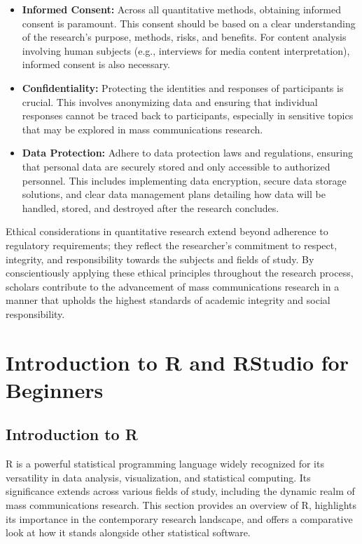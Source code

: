 \documentclass[
]{book}
\begin{document}
\begin{itemize}
\item
  \textbf{Informed Consent:} Across all quantitative methods, obtaining informed consent is paramount. This consent should be based on a clear understanding of the research's purpose, methods, risks, and benefits. For content analysis involving human subjects (e.g., interviews for media content interpretation), informed consent is also necessary.
\item
  \textbf{Confidentiality:} Protecting the identities and responses of participants is crucial. This involves anonymizing data and ensuring that individual responses cannot be traced back to participants, especially in sensitive topics that may be explored in mass communications research.
\item
  \textbf{Data Protection:} Adhere to data protection laws and regulations, ensuring that personal data are securely stored and only accessible to authorized personnel. This includes implementing data encryption, secure data storage solutions, and clear data management plans detailing how data will be handled, stored, and destroyed after the research concludes.
\end{itemize}

Ethical considerations in quantitative research extend beyond adherence to regulatory requirements; they reflect the researcher's commitment to respect, integrity, and responsibility towards the subjects and fields of study. By conscientiously applying these ethical principles throughout the research process, scholars contribute to the advancement of mass communications research in a manner that upholds the highest standards of academic integrity and social responsibility.

\hypertarget{introduction-to-r-and-rstudio-for-beginners}{%
\chapter{Introduction to R and RStudio for Beginners}\label{introduction-to-r-and-rstudio-for-beginners}}

\hypertarget{introduction-to-r}{%
\section{Introduction to R}\label{introduction-to-r}}

R is a powerful statistical programming language widely recognized for its versatility in data analysis, visualization, and statistical computing. Its significance extends across various fields of study, including the dynamic realm of mass communications research. This section provides an overview of R, highlights its importance in the contemporary research landscape, and offers a comparative look at how it stands alongside other statistical software.
\end{document}
